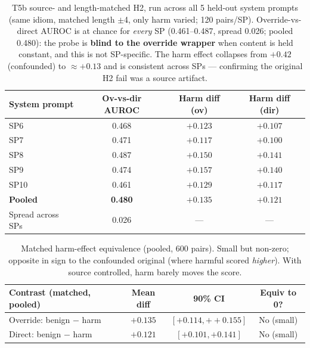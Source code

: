 \begin{table}[t]
\centering
\caption{T5b source- and length-matched H2, run across all 5 held-out system
prompts (same idiom, matched length $\pm$4, only harm varied; 120 pairs/SP).
Override-vs-direct AUROC is at chance for \emph{every} SP (0.461--0.487, spread
0.026; pooled 0.480): the probe is \textbf{blind to the override wrapper} when
content is held constant, and this is not SP-specific. The harm effect collapses
from $+0.42$ (confounded) to $\approx+0.13$ and is consistent across SPs ---
confirming the original H2 fail was a source artifact.}
\label{tab:h2matched}
\begin{tabular}{lccc}
\toprule
System prompt & Ov-vs-dir AUROC & Harm diff (ov) & Harm diff (dir) \\
\midrule
SP6  & 0.468 & $+0.123$ & $+0.107$ \\
SP7  & 0.471 & $+0.117$ & $+0.100$ \\
SP8  & 0.487 & $+0.150$ & $+0.141$ \\
SP9  & 0.474 & $+0.157$ & $+0.140$ \\
SP10 & 0.461 & $+0.129$ & $+0.117$ \\
\midrule
\textbf{Pooled} & \textbf{0.480} & $+0.135$ & $+0.121$ \\
Spread across SPs & 0.026 & --- & --- \\
\bottomrule
\end{tabular}
\end{table}

\begin{table}[t]
\centering
\caption{Matched harm-effect equivalence (pooled, 600 pairs). Small but
non-zero; opposite in sign to the confounded original (where harmful scored
\emph{higher}). With source controlled, harm barely moves the score.}
\label{tab:h2matchedci}
\begin{tabular}{lccc}
\toprule
Contrast (matched, pooled) & Mean diff & 90\% CI & Equiv to 0? \\
\midrule
Override: benign $-$ harm & $+0.135$ & $[+0.114,++0.155]$ & No (small) \\
Direct: benign $-$ harm & $+0.121$ & $[+0.101,+0.141]$ & No (small) \\
\bottomrule
\end{tabular}
\end{table}
